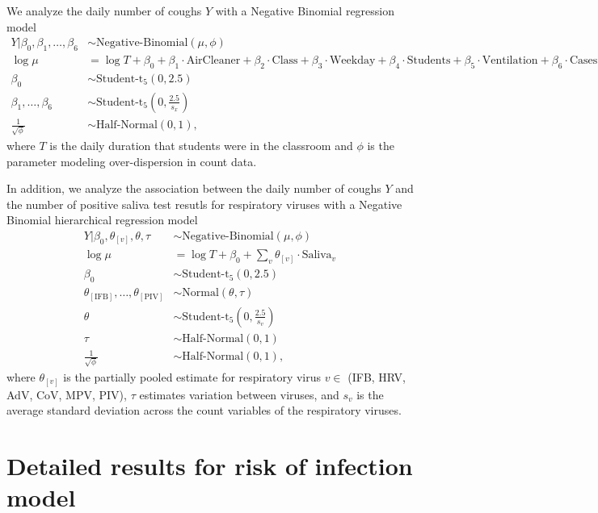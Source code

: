 \documentclass[fleqn,11pt]{wlscirep_supp}
\begin{document}
We analyze the daily number of coughs $Y$ with a Negative Binomial regression model
\begin{align*}
    Y | \beta_0, \beta_1, \dots, \beta_6 &\sim \text{Negative-Binomial}(\mu,\phi) \\
    \log \mu &= \log T + \beta_0 + \beta_1 \cdot \text{AirCleaner} + \beta_2 \cdot \text{Class} + \beta_3 \cdot \text{Weekday} + \beta_4 \cdot \text{Students} + \beta_5 \cdot \text{Ventilation} + \beta_6 \cdot \text{Cases} \\
    \beta_0 &\sim \text{Student-t}_5(0, 2.5) \\
    \beta_1, \dots, \beta_6 &\sim \text{Student-t}_5\left(0, \frac{2.5}{s_{x}}\right) \\
    \frac{1}{\sqrt{\phi}} &\sim \text{Half-Normal}(0,1),
\end{align*}
where $T$ is the daily duration that students were in the classroom and $\phi$ is the parameter modeling over-dispersion in count data. 

In addition, we analyze the association between the daily number of coughs $Y$ and the number of positive saliva test resutls for respiratory viruses with a Negative Binomial hierarchical regression model
\begin{align*}
    Y | \beta_0, \theta_{[v]}, \theta, \tau &\sim \text{Negative-Binomial}(\mu,\phi) \\
    \log \mu &= \log T + \beta_0 + \sum_v \theta_{[v]} \cdot \text{Saliva}_v \\
    \beta_0 &\sim \text{Student-t}_5(0, 2.5) \\
    \theta_{[\text{IFB}]}, \dots, \theta_{[\text{PIV}]} &\sim \text{Normal}\left(\theta, \tau\right) \\
    \theta &\sim \text{Student-t}_5\left(0, \frac{2.5}{s_{v}}\right) \\
    \tau &\sim \text{Half-Normal}\left(0, 1\right) \\
    \frac{1}{\sqrt{\phi}} &\sim \text{Half-Normal}(0,1),
\end{align*}
where $\theta_{[v]}$ is the partially pooled estimate for respiratory virus $v \in$ (IFB, HRV, AdV, CoV, MPV, PIV), $\tau$ estimates variation between viruses, and $s_v$ is the average standard deviation across the count variables of the respiratory viruses. 

\section{Detailed results for risk of infection model}\label{sec:detailed-redcap}
\end{document}
